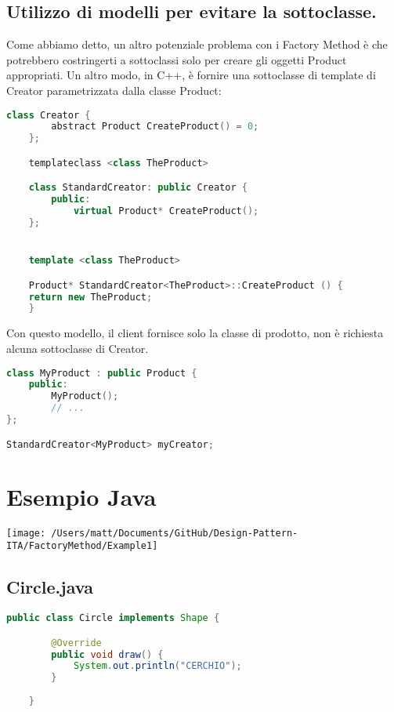 \subsection{Utilizzo di modelli per evitare la sottoclasse.} 
Come abbiamo detto, un altro potenziale problema con i Factory Method è che potrebbero costringerti a sottoclassi solo per creare gli oggetti Product appropriati. Un altro modo, in C++, è fornire una sottoclasse di template di Creator parametrizzata dalla classe Product:

\begin{lstlisting}[language=c++]
    class Creator {
        abstract Product CreateProduct() = 0;
    };

    templateclass <class TheProduct>

    class StandardCreator: public Creator {
        public:
            virtual Product* CreateProduct();
    };


    template <class TheProduct>

    Product* StandardCreator<TheProduct>::CreateProduct () {
    return new TheProduct;
    }
\end{lstlisting}

Con questo modello, il client fornisce solo la classe di prodotto, non è richiesta alcuna sottoclasse di Creator.

\begin{lstlisting}[language=c++]
class MyProduct : public Product {
    public:
        MyProduct();
        // ... 
};

StandardCreator<MyProduct> myCreator;
\end{lstlisting}


\section{Esempio Java}
\texttt{[image: /Users/matt/Documents/GitHub/Design-Pattern-ITA/FactoryMethod/Example1]}

\subsection{Circle.java}
\begin{lstlisting}[language=java]
    public class Circle implements Shape {

        @Override
        public void draw() {
            System.out.println("CERCHIO");
        }
        
    }
\end{lstlisting}

